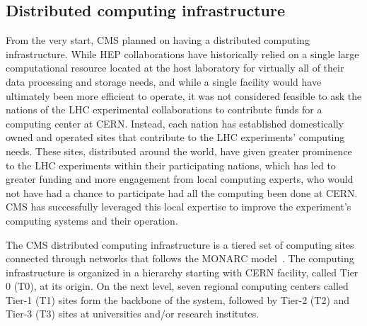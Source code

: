 \subsection{Distributed computing infrastructure}





From the very start, CMS planned on having a distributed computing
infrastructure.  While HEP collaborations have historically relied on a
single large computational resource located at the host laboratory for
virtually all of their data processing and storage needs, and while a
single facility would have ultimately been more efficient to operate, it
was not considered feasible to ask the nations of the LHC experimental
collaborations to contribute funds for a computing center at CERN.
Instead, each nation has established domestically owned and operated sites
that contribute to the LHC experiments' computing needs.  These sites,
distributed around the world, have given greater prominence to the LHC
experiments within their participating nations, which has led to greater
funding and more engagement from local computing experts, who would not
have had a chance to participate had all the computing been done at CERN.
CMS has successfully leveraged this local expertise to improve the
experiment's computing systems and their operation.

The CMS distributed computing infrastructure is a tiered set of computing
sites connected through networks that follows the MONARC
model~\cite{MONARC}. The computing infrastructure is organized in a
hierarchy starting with CERN facility, called Tier 0 (T0), at its origin.
On the next level, seven regional computing centers called Tier-1 (T1)
sites form the backbone of the system, followed by Tier-2 (T2) and Tier-3
(T3) sites at universities and/or research institutes.

